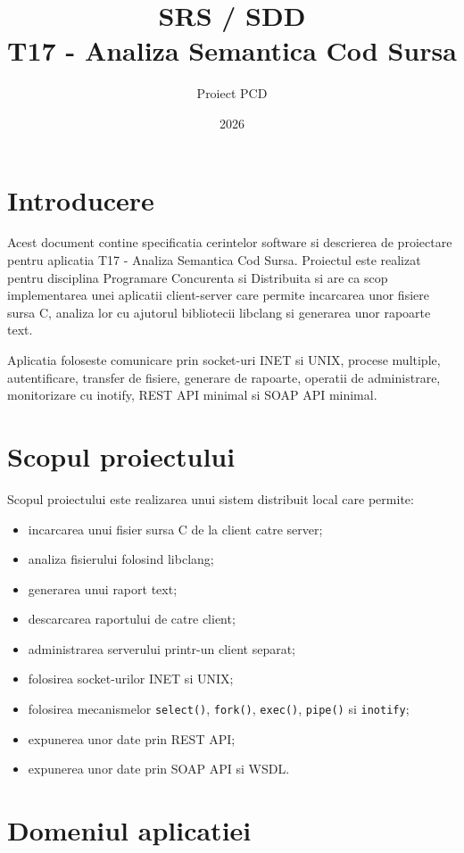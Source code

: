 \documentclass[12pt,a4paper]{article}
\title{SRS / SDD \\ T17 - Analiza Semantica Cod Sursa}
\author{Proiect PCD}
\date{2026}
\begin{document}
\maketitle
\tableofcontents
\newpage

\section{Introducere}

Acest document contine specificatia cerintelor software si descrierea de proiectare pentru aplicatia T17 - Analiza Semantica Cod Sursa. Proiectul este realizat pentru disciplina Programare Concurenta si Distribuita si are ca scop implementarea unei aplicatii client-server care permite incarcarea unor fisiere sursa C, analiza lor cu ajutorul bibliotecii libclang si generarea unor rapoarte text.

Aplicatia foloseste comunicare prin socket-uri INET si UNIX, procese multiple, autentificare, transfer de fisiere, generare de rapoarte, operatii de administrare, monitorizare cu inotify, REST API minimal si SOAP API minimal.

\section{Scopul proiectului}

Scopul proiectului este realizarea unui sistem distribuit local care permite:

\begin{itemize}
    \item incarcarea unui fisier sursa C de la client catre server;
    \item analiza fisierului folosind libclang;
    \item generarea unui raport text;
    \item descarcarea raportului de catre client;
    \item administrarea serverului printr-un client separat;
    \item folosirea socket-urilor INET si UNIX;
    \item folosirea mecanismelor \texttt{select()}, \texttt{fork()}, \texttt{exec()}, \texttt{pipe()} si \texttt{inotify};
    \item expunerea unor date prin REST API;
    \item expunerea unor date prin SOAP API si WSDL.
\end{itemize}

\section{Domeniul aplicatiei}
\end{document}
